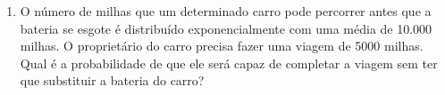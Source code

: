 \begin{enumerate}
\item O número de milhas que um determinado carro pode percorrer antes que a bateria se esgote é distribuído exponencialmente com uma média de 10.000 milhas. O proprietário do carro precisa fazer uma viagem de 5000 milhas. Qual é a probabilidade de que ele será capaz de completar a viagem sem ter que substituir a bateria do carro?

\end{enumerate}




